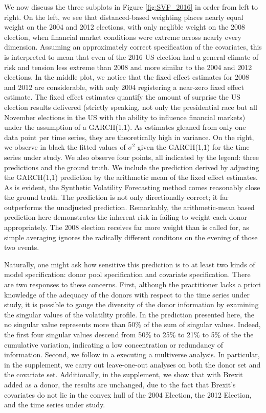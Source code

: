 \documentclass[11pt]{article}
\theoremstyle{definition}
\begin{document}
We now discuss the three subplots in Figure \ref{fig:SVF_2016} in order from left to right.  On the left, we see that distanced-based weighting places nearly equal weight on the 2004 and 2012 elections, with only neglible weight on the 2008 election, when financial market conditions were extreme across nearly every dimension.  Assuming an approximately correct specification of the covariates, this is interpreted to mean that even of the 2016 US election had a general climate of risk and tension less extreme than 2008 and more similar to the 2004 and 2012 elections.  In the middle plot, we notice that the fixed effect estimates for 2008 and 2012 are considerable, with only 2004 registering a near-zero fixed effect estimate.  The fixed effect estimates quantify the amount of surprise the US election results delivered (strictly speaking, not only the presidential race but all November elections in the US with the ability to influence financial markets) under the assumption of a GARCH(1,1).  As estimates gleaned from only one data point per time series, they are theoretically high in variance.  On the right, we observe in black the fitted values of $\sigma^{2}$ given the GARCH(1,1) for the time series under study.  We also observe four points, all indicated by the legend: three predictions and the ground truth.  We include the prediction derived by adjusting the GARCH(1,1) prediction by the arithmetic mean of the fixed effect estimates.  As is evident, the Synthetic Volatility Forecasting method comes reasonably close the ground truth.  The prediction is not only directionally correct; it far outperforms the unadjusted prediction.  Remarkably, the arithmetic-mean based prediction here demonstrates the inherent risk in failing to weight each donor appropriately.  The 2008 election receives far more weight than is called for, as simple averaging ignores the radically different conditons on the evening of those two events.  

Naturally, one might ask how sensitive this prediction is to at least two kinds of model specification: donor pool specification and covariate specification.  There are two responses to these concerns.  First, although the practitioner lacks a priori knowledge of the adequacy of the donors with respect to the time series under study, it is possible to gauge the diversity of the donor information by examining the singular values of the volatility profile.  In the prediction presented here, the no singular value represents more than 50$\%$ of the sum of singular values.  Indeed, the first four singular values descend from 50$\%$ to 25$\%$ to 21$\%$ to 5$\%$ of the the cumulative variation, indicating a low concentration or redundancy of information.  Second, we follow \citet{steegen2016increasing} in a executing a multiverse analysis.  In particular, in the supplement, we carry out leave-one-out analyses on both the donor set and the covariate set.  Additionally, in the supplement, we show that with Brexit added as a donor, the results are unchanged, due to the fact that Brexit's covariates do not lie in the convex hull of the 2004 Election, the 2012 Election, and the time series under study.
\end{document}
